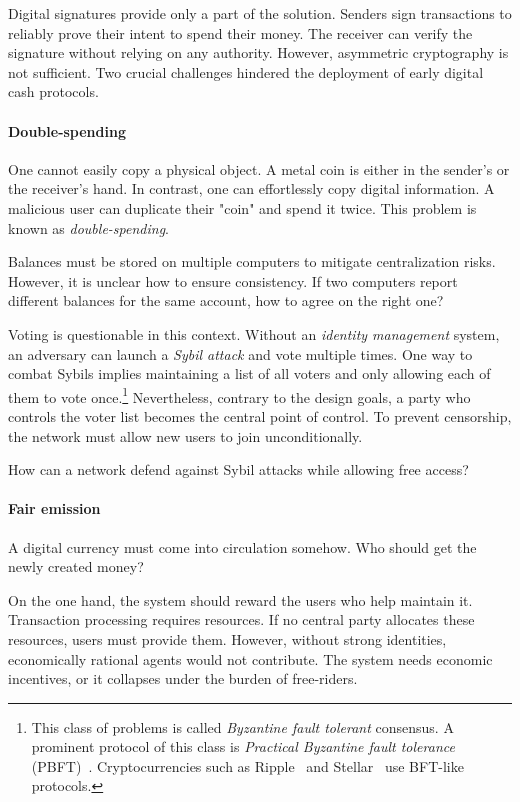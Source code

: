 Digital signatures provide only a part of the solution.
Senders sign transactions to reliably prove their intent to spend their money.
The receiver can verify the signature without relying on any authority.
However, asymmetric cryptography is not sufficient.
Two crucial challenges hindered the deployment of early digital cash protocols.

\paragraph{Double-spending}

One cannot easily copy a physical object.
A metal coin is either in the sender's or the receiver's hand.
In contrast, one can effortlessly copy digital information.
A malicious user can duplicate their "coin" and spend it twice.
This problem is known as \textit{double-spending}.

Balances must be stored on multiple computers to mitigate centralization risks.
However, it is unclear how to ensure consistency.
If two computers report different balances for the same account, how to agree on the right one?

Voting is questionable in this context.
Without an \textit{identity management} system, an adversary can launch a \textit{Sybil attack} and vote multiple times.
One way to combat Sybils implies maintaining a list of all voters and only allowing each of them to vote once.\footnote{This class of problems is called \textit{Byzantine fault tolerant} consensus.
A prominent protocol of this class is \textit{Practical Byzantine fault tolerance} (PBFT)~\cite{Castro2002}.
Cryptocurrencies such as Ripple~\cite{Schwartz2014} and Stellar~\cite{Mazieres2014} use BFT-like protocols.}
Nevertheless, contrary to the design goals, a party who controls the voter list becomes the central point of control.
To prevent censorship, the network must allow new users to join unconditionally.

How can a network defend against Sybil attacks while allowing free access?


\paragraph{Fair emission}

A digital currency must come into circulation somehow.
Who should get the newly created money?

On the one hand, the system should reward the users who help maintain it.
Transaction processing requires resources.
If no central party allocates these resources, users must provide them.
However, without strong identities, economically rational agents would not contribute.
The system needs economic incentives, or it collapses under the burden of free-riders.

